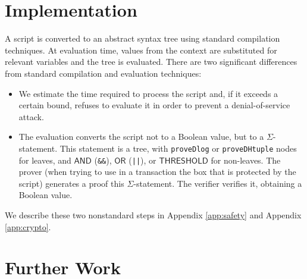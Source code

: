 \documentclass[11pt]{article}
\newcommand{\authnote}[2]{\marginpar{\parbox{\marginparwidth}{\tiny %
  \textsf{#1 {\textcolor{blue}{notes: #2}}}}}%
  \textcolor{blue}{\textbf{\dag}}}
\newcommand{\authnote}[2]{
  \textsf{#1 \textcolor{blue}{: #2}}}
\newcommand{\authnote}[2]{}
\newcommand{\lnote}[1]{{\authnote{\textcolor{orange}{Leo notes}}{#1}}}
\newcommand{\ignore}[1]{}
\newcommand{\andnode}{\ensuremath{\mathsf{AND}}}
\newcommand{\ornode}{\ensuremath{\mathsf{OR}}}
\newcommand{\tnode}{\ensuremath{\mathsf{THRESHOLD}}}
\begin{document}
\ignore{
\subsection{Merkle Trees}
Explain \texttt{isMember} and provide an example of usage. Explain that the context also contains the root hash of the all the unspent output boxes in the previous block \lnote{check: previous or current block? It would seem that the current is not available, so it should be previous.}, available via the predefined variable \texttt{LastBlockUtxoRootHash}. Give examples of usage, such as oracle, MAST, FSM. (For the oracle, explain that our language is rich enough to support signature verification within the script.)
}




\section{Implementation}
\label{sec:impl}
A script is converted to an abstract syntax tree using standard compilation techniques. At evaluation time, values from the context are substituted for relevant variables and the tree is evaluated. There are two significant differences from standard compilation and evaluation techniques:

\begin{itemize}
\item We estimate the time required to process the script and, if it exceeds a certain bound, refuses to evaluate it in order to prevent a denial-of-service attack.
\item The evaluation converts the script not to a Boolean value, but to a $\Sigma$-statement. This statement is a tree, with  \texttt{proveDlog} or \texttt{proveDHtuple} nodes for leaves, and $\andnode$ (\texttt{\&\&}), $\ornode$ (\texttt{||}), or $\tnode$ for  non-leaves. The prover (when trying to use in a transaction the box that is protected by the script) generates a proof this $\Sigma$-statement. The verifier verifies it, obtaining a Boolean value.
\end{itemize}

We describe these two nonstandard steps in Appendix \ref{app:safety} and Appendix \ref{app:crypto}.

\section{Further Work}
\label{sec:further}
\end{document}
